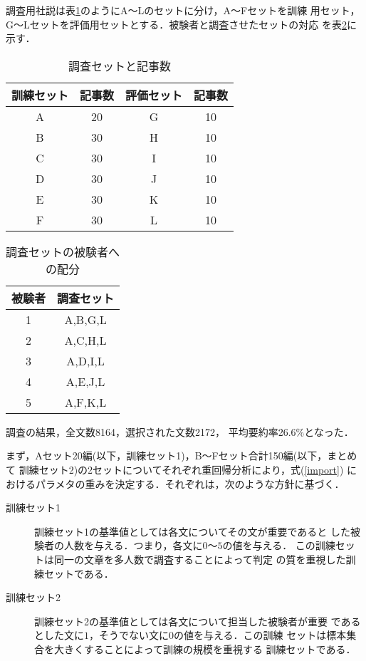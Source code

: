 調査用社説は表\ref{tab:set}のようにA〜Lのセットに分け，A〜Fセットを訓練
用セット，G〜Lセットを評価用セットとする．被験者と調査させたセットの対応
を表\ref{tab:set2}に示す．

{\small
 \begin{table}[htbp]
  \begin{center}
   \begin{tabular}{|c|c||c|c|} \hline
    訓練セット & 記事数 & 評価セット& 記事数 \\ \hline \hline
    A & 20 & G & 10 \\ \cline{1-2}
    B & 30 & H & 10 \\ 
    C & 30 & I & 10 \\ 
    D & 30 & J & 10 \\ 
    E & 30 & K & 10 \\ \cline{3-4}
    F & 30 & L & 10 \\ \hline
   \end{tabular}
  \end{center}
  \caption{調査セットと記事数}
  \label{tab:set}
 \end{table}
}


{\small
 \begin{table}[htbp]
  \begin{center}
   \begin{tabular}{|c|c|} \hline
    被験者  & 調査セット \\ \hline \hline
    1 & A,B,G,L \\ \hline
    2 & A,C,H,L \\ \hline
    3 & A,D,I,L \\ \hline
    4 & A,E,J,L \\ \hline
    5 & A,F,K,L \\ \hline
   \end{tabular}
  \end{center}
  \caption{調査セットの被験者への配分}
  \label{tab:set2}
 \end{table}
}

調査の結果，全文数8164，選択された文数2172，
平均要約率26.6\%となった．

まず，Aセット20編(以下，訓練セット1)，B〜Fセット合計150編(以下，まとめて
訓練セット2)の2セットについてそれぞれ重回帰分析により，式(\ref{import})
におけるパラメタの重みを決定する．それぞれは，次のような方針に基づく．

\begin{description}
 \item[訓練セット1] 
	    訓練セット1の基準値としては各文についてその文が重要であると
	    した被験者の人数を与える．つまり，各文に$0〜5$の値を与える．
	    この訓練セットは同一の文章を多人数で調査することによって判定
	    の質を重視した訓練セットである．
 \item[訓練セット2] 
	    訓練セット2の基準値としては各文について担当した被験者が重要
	    であるとした文に$1$，そうでない文に$0$の値を与える．この訓練
	    セットは標本集合を大きくすることによって訓練の規模を重視する
	    訓練セットである．
\end{description}

